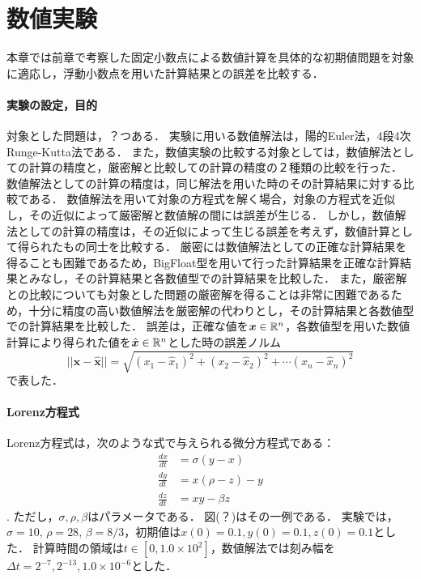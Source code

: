 \chapter{数値実験}
本章では前章で考察した固定小数点による数値計算を具体的な初期値問題を対象に適応し，浮動小数点を用いた計算結果との誤差を比較する．

\subsubsection{実験の設定，目的}
対象とした問題は，？つある．
実験に用いる数値解法は，陽的Euler法，4段4次Runge-Kutta法である．
また，数値実験の比較する対象としては，数値解法としての計算の精度と，厳密解と比較しての計算の精度の２種類の比較を行った．
数値解法としての計算の精度は，同じ解法を用いた時のその計算結果に対する比較である．
数値解法を用いて対象の方程式を解く場合，対象の方程式を近似し，その近似によって厳密解と数値解の間には誤差が生じる．
しかし，数値解法としての計算の精度は，その近似によって生じる誤差を考えず，数値計算として得られたもの同士を比較する．
厳密には数値解法としての正確な計算結果を得ることも困難であるため，BigFloat型を用いて行った計算結果を正確な計算結果とみなし，その計算結果と各数値型での計算結果を比較した．
また，厳密解との比較についても対象とした問題の厳密解を得ることは非常に困難であるため，十分に精度の高い数値解法を厳密解の代わりとし，その計算結果と各数値型での計算結果を比較した．
誤差は，正確な値を$\bm{x} \in \mathbb{R}^n$，各数値型を用いた数値計算により得られた値を$\hat{\bm{x}} \in \mathbb{R}^n$とした時の誤差ノルム
\begin{equation}
    ||\bm{x} - \hat{\bm{x}}|| = \sqrt{(x_1 - \hat{x}_1)^2 + (x_2 - \hat{x}_2)^2 + \cdots (x_n - \hat{x}_n)^2}
\end{equation}
で表した．
\subsubsection{Lorenz方程式}
Lorenz方程式は，次のような式で与えられる微分方程式である：
\begin{align}
    \frac{dx}{dt} &= \sigma(y-x) \\
    \frac{dy}{dt} &= x(\rho-z)-y \\
    \frac{dz}{dt} &= xy - \beta z
\end{align}.
ただし，$\sigma,\rho,\beta$はパラメータである．
図(？)はその一例である．
実験では，$\sigma=10$, $\rho=28$, $\beta=8/3$，初期値は$x(0) = 0.1, y(0) = 0.1, z(0) = 0.1$とした．
計算時間の領域は$t \in [0,1.0 \times 10^2]$，数値解法では刻み幅を$\Delta t =  2^{-7}, 2^{-13}, 1.0 \times 10^{-6}$とした．
